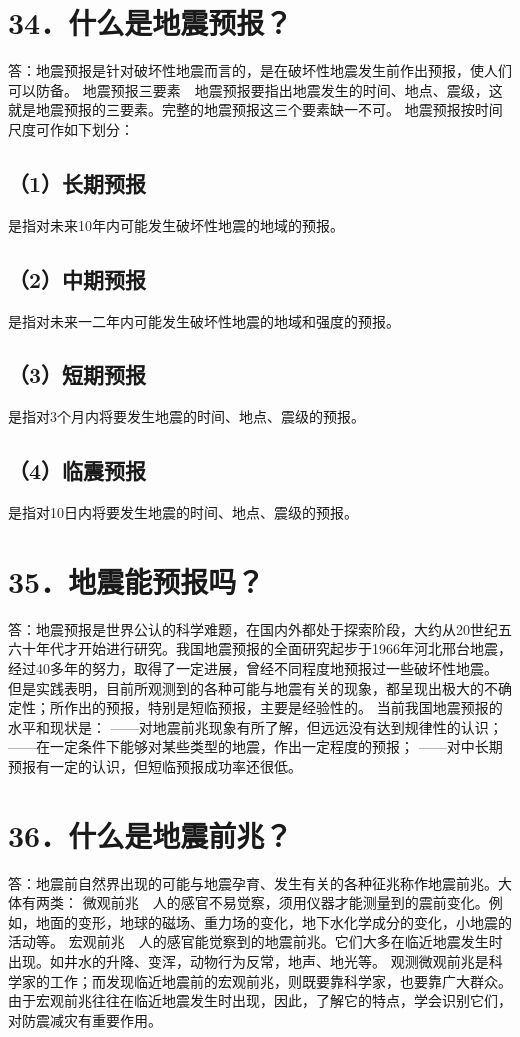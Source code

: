 \documentclass[a4paper,12pt,english]{sphinxmanual}
\begin{document}
\section{34．什么是地震预报？}
\label{\detokenize{index:id36}}
答：地震预报是针对破坏性地震而言的，是在破坏性地震发生前作出预报，使人们可以防备。
地震预报三要素　地震预报要指出地震发生的时间、地点、震级，这就是地震预报的三要素。完整的地震预报这三个要素缺一不可。
地震预报按时间尺度可作如下划分：


\subsection{（1）长期预报}
\label{\detokenize{index:id37}}
是指对未来10年内可能发生破坏性地震的地域的预报。


\subsection{（2）中期预报}
\label{\detokenize{index:id38}}
是指对未来一二年内可能发生破坏性地震的地域和强度的预报。


\subsection{（3）短期预报}
\label{\detokenize{index:id39}}
是指对3个月内将要发生地震的时间、地点、震级的预报。


\subsection{（4）临震预报}
\label{\detokenize{index:id40}}
是指对10日内将要发生地震的时间、地点、震级的预报。


\section{35．地震能预报吗？}
\label{\detokenize{index:id41}}
答：地震预报是世界公认的科学难题，在国内外都处于探索阶段，大约从20世纪五六十年代才开始进行研究。我国地震预报的全面研究起步于1966年河北邢台地震，经过40多年的努力，取得了一定进展，曾经不同程度地预报过一些破坏性地震。
但是实践表明，目前所观测到的各种可能与地震有关的现象，都呈现出极大的不确定性；所作出的预报，特别是短临预报，主要是经验性的。
当前我国地震预报的水平和现状是：
——对地震前兆现象有所了解，但远远没有达到规律性的认识；
——在一定条件下能够对某些类型的地震，作出一定程度的预报；
——对中长期预报有一定的认识，但短临预报成功率还很低。


\section{36．什么是地震前兆？}
\label{\detokenize{index:id42}}
答：地震前自然界出现的可能与地震孕育、发生有关的各种征兆称作地震前兆。大体有两类：
微观前兆　人的感官不易觉察，须用仪器才能测量到的震前变化。例如，地面的变形，地球的磁场、重力场的变化，地下水化学成分的变化，小地震的活动等。
宏观前兆　人的感官能觉察到的地震前兆。它们大多在临近地震发生时出现。如井水的升降、变浑，动物行为反常，地声、地光等。
观测微观前兆是科学家的工作；而发现临近地震前的宏观前兆，则既要靠科学家，也要靠广大群众。由于宏观前兆往往在临近地震发生时出现，因此，了解它的特点，学会识别它们，对防震减灾有重要作用。
\end{document}
